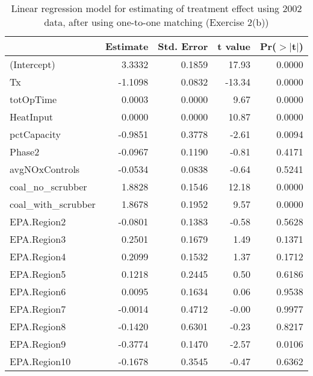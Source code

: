 


\begin{table}[ht]
\centering
\begin{tabular}{lrrrr}
  \toprule
 & Estimate & Std. Error & t value & Pr($>$$|$t$|$) \\ 
  \midrule
(Intercept) & 3.3332 & 0.1859 & 17.93 & 0.0000 \\ 
  Tx & -1.1098 & 0.0832 & -13.34 & 0.0000 \\ 
  totOpTime & 0.0003 & 0.0000 & 9.67 & 0.0000 \\ 
  HeatInput & 0.0000 & 0.0000 & 10.87 & 0.0000 \\ 
  pctCapacity & -0.9851 & 0.3778 & -2.61 & 0.0094 \\ 
  Phase2 & -0.0967 & 0.1190 & -0.81 & 0.4171 \\ 
  avgNOxControls & -0.0534 & 0.0838 & -0.64 & 0.5241 \\ 
  coal\_no\_scrubber & 1.8828 & 0.1546 & 12.18 & 0.0000 \\ 
  coal\_with\_scrubber & 1.8678 & 0.1952 & 9.57 & 0.0000 \\ 
  EPA.Region2 & -0.0801 & 0.1383 & -0.58 & 0.5628 \\ 
  EPA.Region3 & 0.2501 & 0.1679 & 1.49 & 0.1371 \\ 
  EPA.Region4 & 0.2099 & 0.1532 & 1.37 & 0.1712 \\ 
  EPA.Region5 & 0.1218 & 0.2445 & 0.50 & 0.6186 \\ 
  EPA.Region6 & 0.0095 & 0.1634 & 0.06 & 0.9538 \\ 
  EPA.Region7 & -0.0014 & 0.4712 & -0.00 & 0.9977 \\ 
  EPA.Region8 & -0.1420 & 0.6301 & -0.23 & 0.8217 \\ 
  EPA.Region9 & -0.3774 & 0.1470 & -2.57 & 0.0106 \\ 
  EPA.Region10 & -0.1678 & 0.3545 & -0.47 & 0.6362 \\ 
   \bottomrule
\end{tabular}
\caption{Linear regression model for estimating of treatment effect using 2002 data, after using one-to-one matching (Exercise 2(b))} 
\label{tab:lm-2b-02}
\end{table}

